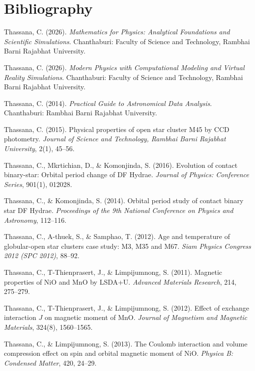 \chapter*{Bibliography}
\label{chap:references}

\begin{enumerate}[label={[\arabic*]}, leftmargin=2.5em, itemsep=7pt]
    \item Thassana, C. (2026). \textit{Mathematics for Physics: Analytical Foundations and Scientific Simulations}. Chanthaburi: Faculty of Science and Technology, Rambhai Barni Rajabhat University.
    \item Thassana, C. (2026). \textit{Modern Physics with Computational Modeling and Virtual Reality Simulations}. Chanthaburi: Faculty of Science and Technology, Rambhai Barni Rajabhat University.
    \item Thassana, C. (2014). \textit{Practical Guide to Astronomical Data Analysis}. Chanthaburi: Rambhai Barni Rajabhat University.
    \item Thassana, C. (2015). Physical properties of open star cluster M45 by CCD photometry. \textit{Journal of Science and Technology, Rambhai Barni Rajabhat University}, 2(1), 45--56.
    \item Thassana, C., Mkrtichian, D., \& Komonjinda, S. (2016). Evolution of contact binary-star: Orbital period change of DF Hydrae. \textit{Journal of Physics: Conference Series}, 901(1), 012028.
    \item Thassana, C., \& Komonjinda, S. (2014). Orbital period study of contact binary star DF Hydrae. \textit{Proceedings of the 9th National Conference on Physics and Astronomy}, 112--116.
    \item Thassana, C., A-thuek, S., \& Samphao, T. (2012). Age and temperature of globular-open star clusters case study: M3, M35 and M67. \textit{Siam Physics Congress 2012 (SPC 2012)}, 88--92.
    \item Thassana, C., T-Thienprasert, J., \& Limpijumnong, S. (2011). Magnetic properties of NiO and MnO by LSDA+U. \textit{Advanced Materials Research}, 214, 275--279.
    \item Thassana, C., T-Thienprasert, J., \& Limpijumnong, S. (2012). Effect of exchange interaction $J$ on magnetic moment of MnO. \textit{Journal of Magnetism and Magnetic Materials}, 324(8), 1560--1565.
    \item Thassana, C., \& Limpijumnong, S. (2013). The Coulomb interaction and volume compression effect on spin and orbital magnetic moment of NiO. \textit{Physica B: Condensed Matter}, 420, 24--29.

\end{enumerate}
